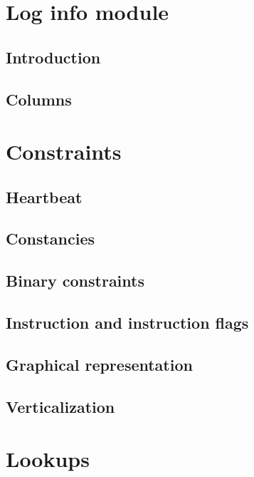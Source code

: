 \section{Log info module}                            \label{log info: generalities}
\subsection{Introduction}                            \label{log info: generalities: intro}                 
\subsection{Columns}                                 \label{log info: generalities: columns}               

\section{Constraints}                                \label{log info: constraints}
\subsection{Heartbeat}                               \label{log info: constraints: heartbeat}              
\subsection{Constancies}                             \label{log info: constraints: constancies}            
\subsection{Binary constraints}                      \label{log info: constraints: binary}                 
\subsection{Instruction and instruction flags}       \label{log info: constraints: inst and flags}         
\subsection{Graphical representation}                \label{log info: constraints: graphical rep data}     
\subsection{Verticalization}                         \label{log info: constraints: verticalization}        

\section{Lookups}                                    \label{log info: lookups}                             
